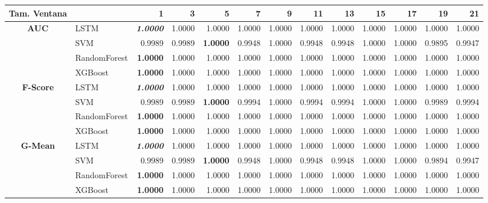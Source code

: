\begin{table}[H]
	\centering
	\begin{adjustbox}{max width=12cm}
		\begin{tabular}{|c|l|r|r|r|r|r|r|r|r|r|r|r|}
			\hline
			\textbf{Tam. Ventana}&         &      1  &      3  &   5  &      7  &   9  &      11 &      13 &   15 &   17 &      19 &      21 \\
			\hline
			\textbf{AUC} &  LSTM & \textit{ \textbf{  1.0000 } } &  1.0000 &  1.0000 &  1.0000 &  1.0000 &  1.0000 &  1.0000 &  1.0000 &  1.0000 &  1.0000 &  1.0000 \\
			&  SVM &  0.9989 &  0.9989 & \textbf{  1.0000 } &  0.9948 &  1.0000 &  0.9948 &  0.9948 &  1.0000 &  1.0000 &  0.9895 &  0.9947 \\
			&  RandomForest & \textbf{  1.0000 } &  1.0000 &  1.0000 &  1.0000 &  1.0000 &  1.0000 &  1.0000 &  1.0000 &  1.0000 &  1.0000 &  1.0000 \\
			&  XGBoost & \textbf{  1.0000 } &  1.0000 &  1.0000 &  1.0000 &  1.0000 &  1.0000 &  1.0000 &  1.0000 &  1.0000 &  1.0000 &  1.0000 \\
			\hline
			\textbf{F-Score} &  LSTM & \textit{ \textbf{  1.0000 } } &  1.0000 &  1.0000 &  1.0000 &  1.0000 &  1.0000 &  1.0000 &  1.0000 &  1.0000 &  1.0000 &  1.0000 \\
			&  SVM &  0.9989 &  0.9989 & \textbf{  1.0000 } &  0.9994 &  1.0000 &  0.9994 &  0.9994 &  1.0000 &  1.0000 &  0.9989 &  0.9994 \\
			&  RandomForest & \textbf{  1.0000 } &  1.0000 &  1.0000 &  1.0000 &  1.0000 &  1.0000 &  1.0000 &  1.0000 &  1.0000 &  1.0000 &  1.0000 \\
			&  XGBoost & \textbf{  1.0000 } &  1.0000 &  1.0000 &  1.0000 &  1.0000 &  1.0000 &  1.0000 &  1.0000 &  1.0000 &  1.0000 &  1.0000 \\
			\hline
			\textbf{G-Mean} &  LSTM & \textit{ \textbf{  1.0000 } } &  1.0000 &  1.0000 &  1.0000 &  1.0000 &  1.0000 &  1.0000 &  1.0000 &  1.0000 &  1.0000 &  1.0000 \\
			&  SVM &  0.9989 &  0.9989 & \textbf{  1.0000 } &  0.9948 &  1.0000 &  0.9948 &  0.9948 &  1.0000 &  1.0000 &  0.9894 &  0.9947 \\
			&  RandomForest & \textbf{  1.0000 } &  1.0000 &  1.0000 &  1.0000 &  1.0000 &  1.0000 &  1.0000 &  1.0000 &  1.0000 &  1.0000 &  1.0000 \\
			&  XGBoost & \textbf{  1.0000 } &  1.0000 &  1.0000 &  1.0000 &  1.0000 &  1.0000 &  1.0000 &  1.0000 &  1.0000 &  1.0000 &  1.0000 \\

\end{tabular}
\end{adjustbox}
\end{table}
